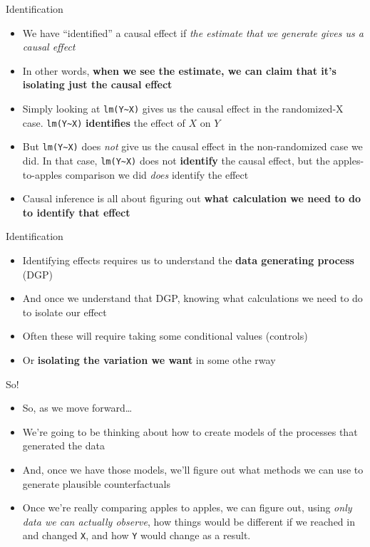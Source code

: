 \documentclass[
  ignorenonframetext,
]{beamer}
\providecommand{\tightlist}{%
  \setlength{\itemsep}{0pt}\setlength{\parskip}{0pt}}
\begin{document}
\begin{frame}[fragile]{Identification}
\label{identification}
\begin{itemize}
\tightlist
\item
  We have ``identified'' a causal effect if \emph{the estimate that we
  generate gives us a causal effect}
\item
  In other words, \textbf{when we see the estimate, we can claim that
  it's isolating just the causal effect}
\item
  Simply looking at \texttt{lm(Y\textasciitilde{}X)} gives us the causal
  effect in the randomized-X case. \texttt{lm(Y\textasciitilde{}X)}
  \textbf{identifies} the effect of \(X\) on \(Y\)
\item
  But \texttt{lm(Y\textasciitilde{}X)} does \emph{not} give us the
  causal effect in the non-randomized case we did. In that case,
  \texttt{lm(Y\textasciitilde{}X)} does not \textbf{identify} the causal
  effect, but the apples-to-apples comparison we did \emph{does}
  identify the effect
\item
  Causal inference is all about figuring out \textbf{what calculation we
  need to do to identify that effect}
\end{itemize}
\end{frame}

\begin{frame}{Identification}
\label{identification-1}
\begin{itemize}
\tightlist
\item
  Identifying effects requires us to understand the \textbf{data
  generating process} (DGP)
\item
  And once we understand that DGP, knowing what calculations we need to
  do to isolate our effect
\item
  Often these will require taking some conditional values (controls)
\item
  Or \textbf{isolating the variation we want} in some othe rway
\end{itemize}
\end{frame}

\begin{frame}[fragile]{So!}
\label{so}
\begin{itemize}
\tightlist
\item
  So, as we move forward\ldots{}
\item
  We're going to be thinking about how to create models of the processes
  that generated the data
\item
  And, once we have those models, we'll figure out what methods we can
  use to generate plausible counterfactuals
\item
  Once we're really comparing apples to apples, we can figure out, using
  \emph{only data we can actually observe}, how things would be
  different if we reached in and changed \texttt{X}, and how \texttt{Y}
  would change as a result.
\end{itemize}
\end{frame}
\end{document}
